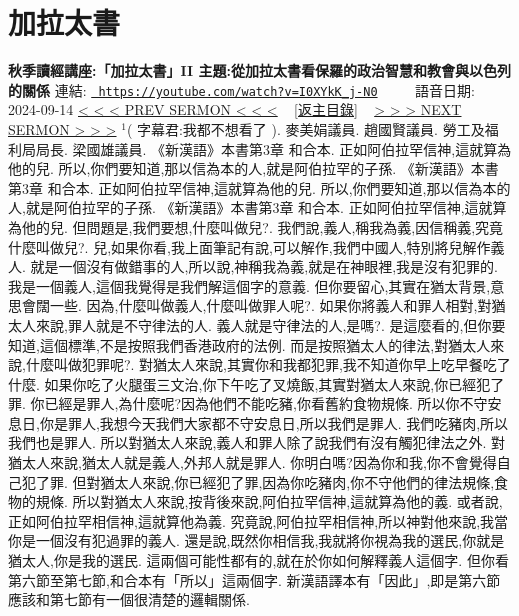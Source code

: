 \documentclass{book}
\begin{document}
\section{加拉太書}
\label{sec:I0XYkK_j_N0}
\textbf{秋季讀經講座:「加拉太書」II 主題:從加拉太書看保羅的政治智慧和教會與以色列的關係}
\newline
\newline
連結: \href{https://youtube.com/watch?v=I0XYkK_j-N0}{\texttt{ https://youtube.com/watch?v=I0XYkK\_j-N0}} ~~~~ 語音日期: 2024-09-14 
\newline
\newline
\hyperref[sec:sEvrhOW5UYA]{\small{< < < PREV SERMON < < <}}
~
\hyperref[sec:index]{\small{[返主目錄]}}
~
\hyperref[sec:JHWtWav3_Y8]{\small{> > > NEXT SERMON > > >}}
\newline
\newline
$^{1}$( 字幕君:我都不想看了 ).
麥美娟議員.
趙國賢議員.
勞工及福利局局長.
梁國雄議員.
《新漢語》本書第3章 和合本.
正如阿伯拉罕信神,這就算為他的兒.
所以,你們要知道,那以信為本的人,就是阿伯拉罕的子孫.
《新漢語》本書第3章 和合本.
正如阿伯拉罕信神,這就算為他的兒.
所以,你們要知道,那以信為本的人,就是阿伯拉罕的子孫.
《新漢語》本書第3章 和合本.
正如阿伯拉罕信神,這就算為他的兒.
但問題是,我們要想,什麼叫做兒?.
我們說,義人,稱我為義,因信稱義,究竟什麼叫做兒?.
兒,如果你看,我上面筆記有說,可以解作,我們中國人,特別將兒解作義人.
就是一個沒有做錯事的人,所以說,神稱我為義,就是在神眼裡,我是沒有犯罪的.
我是一個義人,這個我覺得是我們解這個字的意義.
但你要留心,其實在猶太背景,意思會闊一些.
因為,什麼叫做義人,什麼叫做罪人呢?.
如果你將義人和罪人相對,對猶太人來說,罪人就是不守律法的人.
義人就是守律法的人,是嗎?.
是這麼看的,但你要知道,這個標準,不是按照我們香港政府的法例.
而是按照猶太人的律法,對猶太人來說,什麼叫做犯罪呢?.
對猶太人來說,其實你和我都犯罪,我不知道你早上吃早餐吃了什麼.
如果你吃了火腿蛋三文治,你下午吃了叉燒飯,其實對猶太人來說,你已經犯了罪.
你已經是罪人,為什麼呢?因為他們不能吃豬,你看舊約食物規條.
所以你不守安息日,你是罪人,我想今天我們大家都不守安息日,所以我們是罪人.
我們吃豬肉,所以我們也是罪人.
所以對猶太人來說,義人和罪人除了說我們有沒有觸犯律法之外.
對猶太人來說,猶太人就是義人,外邦人就是罪人.
你明白嗎?因為你和我,你不會覺得自己犯了罪.
但對猶太人來說,你已經犯了罪,因為你吃豬肉,你不守他們的律法規條,食物的規條.
所以對猶太人來說,按背後來說,阿伯拉罕信神,這就算為他的義.
或者說,正如阿伯拉罕相信神,這就算他為義.
究竟說,阿伯拉罕相信神,所以神對他來說,我當你是一個沒有犯過罪的義人.
還是說,既然你相信我,我就將你視為我的選民,你就是猶太人,你是我的選民.
這兩個可能性都有的,就在於你如何解釋義人這個字.
但你看第六節至第七節,和合本有「所以」這兩個字.
新漢語譯本有「因此」,即是第六節應該和第七節有一個很清楚的邏輯關係.
\end{document}
